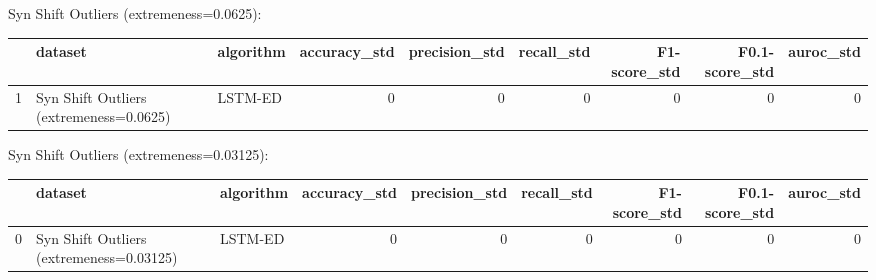 Syn Shift Outliers (extremeness=0.0625):

\begin{tabular}{rllrrrrrr}
\hline
    & dataset                                 & algorithm   &   accuracy\_std &   precision\_std &   recall\_std &   F1-score\_std &   F0.1-score\_std &   auroc\_std \\
\hline
  1 & Syn Shift Outliers (extremeness=0.0625) & LSTM-ED     &              0 &               0 &            0 &              0 &                0 &           0 \\
\hline
\end{tabular}

Syn Shift Outliers (extremeness=0.03125):

\begin{tabular}{rllrrrrrr}
\hline
    & dataset                                  & algorithm   &   accuracy\_std &   precision\_std &   recall\_std &   F1-score\_std &   F0.1-score\_std &   auroc\_std \\
\hline
  0 & Syn Shift Outliers (extremeness=0.03125) & LSTM-ED     &              0 &               0 &            0 &              0 &                0 &           0 \\
\hline
\end{tabular}

